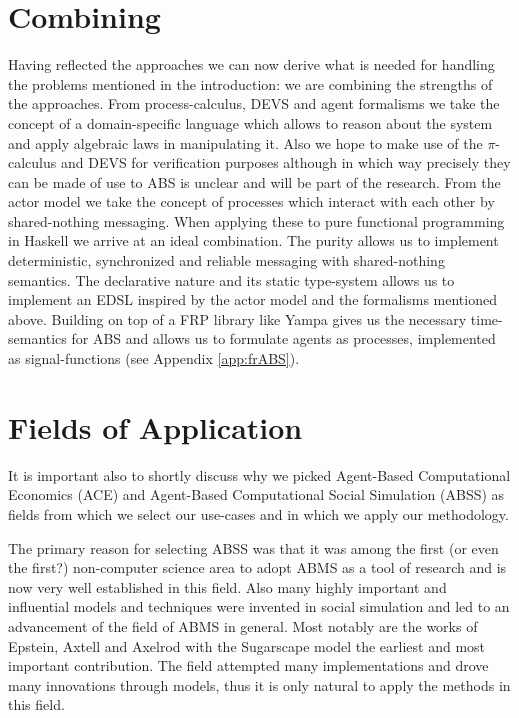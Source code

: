 \section{Combining}
Having reflected the approaches we can now derive what is needed for handling the problems mentioned in the introduction: we are combining the strengths of the approaches. From process-calculus, DEVS and agent formalisms we take the concept of a domain-specific language which allows to reason about the system and apply algebraic laws in manipulating it. Also we hope to make use of the $\pi$-calculus and DEVS for verification purposes although in which way precisely they can be made of use to ABS is unclear and will be part of the research. From the actor model we take the concept of processes which interact with each other by shared-nothing messaging.
When applying these to pure functional programming in Haskell we arrive at an ideal combination. The purity allows us to implement deterministic, synchronized and reliable messaging with shared-nothing semantics. The declarative nature and its static type-system allows us to implement an EDSL inspired by the actor model and the formalisms mentioned above. Building on top of a FRP library like Yampa gives us the necessary time-semantics for ABS and allows us to formulate agents as processes, implemented as signal-functions (see Appendix \ref{app:frABS}).

\section{Fields of Application}
It is important also to shortly discuss why we picked Agent-Based Computational Economics (ACE) and Agent-Based Computational Social Simulation (ABSS) as fields from which we select our use-cases and in which we apply our methodology.

The primary reason for selecting ABSS was that it was among the first (or even the first?) non-computer science area to adopt ABMS as a tool of research and is now very well established in this field. Also many highly important and influential models and techniques were invented in social simulation and led to an advancement of the field of ABMS in general. Most notably are the works of Epstein, Axtell and Axelrod with the Sugarscape model the earliest and most important contribution. The field attempted many implementations and drove many innovations through models, thus it is only natural to apply the methods in this field.

